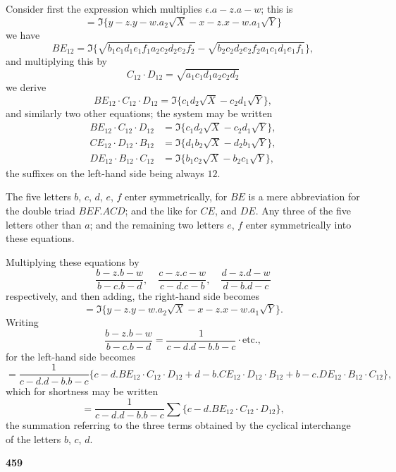 \documentclass[12pt,a4paper]{article}
\theoremstyle{definition}
\begin{document}
Consider first the expression which multiplies $\epsilon . a - z . a - w$; this is
\[
= \Im\{y - z . y - w . a_2 \sqrt{X} - x - z . x - w . a_1 \sqrt{Y}\}
\]
we have
\[
BE_{12} = \Im\{\sqrt{b_1 c_1 d_1 e_1 f_1 a_2 c_2 d_2 e_2 f_2} - \sqrt{b_2 c_2 d_2 e_2 f_2 a_1 c_1 d_1 e_1 f_1}\},
\]
and multiplying this by
\[
C_{12} \cdot D_{12} = \sqrt{a_1 c_1 d_1 a_2 c_2 d_2}
\]
we derive
\[
BE_{12} \cdot C_{12} \cdot D_{12} = \Im\{c_1 d_2 \sqrt{X} - c_2 d_1 \sqrt{Y}\},
\]
and similarly two other equations; the system may be written
\begin{align*}
BE_{12} \cdot C_{12} \cdot D_{12} &= \Im\{c_1 d_2 \sqrt{X} - c_2 d_1 \sqrt{Y}\}, \\
CE_{12} \cdot D_{12} \cdot B_{12} &= \Im\{d_1 b_2 \sqrt{X} - d_2 b_1 \sqrt{Y}\}, \\
DE_{12} \cdot B_{12} \cdot C_{12} &= \Im\{b_1 c_2 \sqrt{X} - b_2 c_1 \sqrt{Y}\},
\end{align*}
the suffixes on the left-hand side being always $12$.

The five letters $b$, $c$, $d$, $e$, $f$ enter symmetrically, for $BE$ is a mere abbreviation for the double triad $BEF.ACD$; and the like for $CE$, and $DE$. Any three of the five letters other than $a$; and the remaining two letters $e$, $f$ enter symmetrically into these equations.

Multiplying these equations by
\[
\frac{b - z . b - w}{b - c . b - d},\quad \frac{c - z . c - w}{c - d . c - b},\quad \frac{d - z . d - w}{d - b . d - c}
\]
respectively, and then adding, the right-hand side becomes
\[
= \Im\{y - z . y - w . a_2 \sqrt{X} - x - z . x - w . a_1 \sqrt{Y}\}.
\]
Writing
\[
\frac{b - z . b - w}{b - c . b - d} = \frac{1}{c - d . d - b . b - c} \cdot \text{etc.},
\]
for the left-hand side becomes
\[
= \frac{1}{c - d . d - b . b - c} \{c - d . BE_{12} \cdot C_{12} \cdot D_{12} + d - b . CE_{12} \cdot D_{12} \cdot B_{12} + b - c . DE_{12} \cdot B_{12} \cdot C_{12}\},
\]
which for shortness may be written
\[
= \frac{1}{c - d . d - b . b - c} \sum\{c - d . BE_{12} \cdot C_{12} \cdot D_{12}\},
\]
the summation referring to the three terms obtained by the cyclical interchange of the letters $b$, $c$, $d$.

\vspace{1em}

\begin{center}
\textbf{459}
\end{center}

\vspace{0.5em}
\end{document}
